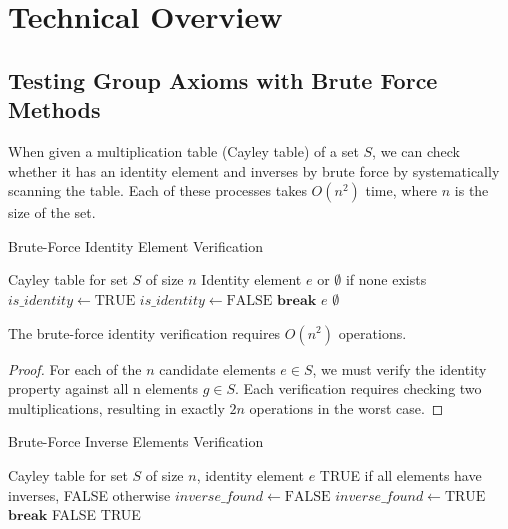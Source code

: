 \documentclass[sigconf]{acmart}
\begin{document}
\section{Technical Overview}
\subsection{Testing Group Axioms with Brute Force Methods}
When given a multiplication table (Cayley table) of a set $S$, we can check whether it has an identity element and inverses by brute force by systematically scanning the table. Each of these processes takes $O(n^2)$ time, where $n$ is the size of the set.

\begin{algorithm}[H]
\caption{Brute-Force Identity Element Verification}
\begin{algorithmic}[1]
\REQUIRE Cayley table for set $S$ of size $n$
\ENSURE Identity element $e$ or $\emptyset$ if none exists
    \STATE $is\_identity \gets \text{TRUE}$
            \STATE $is\_identity \gets \text{FALSE}$
            \STATE $\textbf{break}$
        \ENDIF
    \ENDFOR
        \RETURN $e$
    \ENDIF
\ENDFOR
\STATE \RETURN $\emptyset$
\end{algorithmic}
\end{algorithm}

\begin{proposition}
The brute-force identity verification requires \( O(n^2)\) operations.
\end{proposition}

\begin{proof}
For each of the $n$ candidate elements $e\in S$, we must verify the identity property against all n elements $g \in S$. Each verification requires checking two multiplications, resulting in exactly $2n$ operations in the worst case.
\end{proof}



\begin{algorithm}[H]
\caption{Brute-Force Inverse Elements Verification}
\begin{algorithmic}[1]
\REQUIRE Cayley table for set $S$ of size $n$, identity element $e$
\ENSURE TRUE if all elements have inverses, FALSE otherwise
    \STATE $inverse\_found \gets \text{FALSE}$
            \STATE $inverse\_found \gets \text{TRUE}$
            \STATE $\textbf{break}$
        \ENDIF
    \ENDFOR
        \RETURN FALSE
    \ENDIF
\ENDFOR
\STATE \RETURN TRUE
\end{algorithmic}
\end{algorithm}
\end{document}
